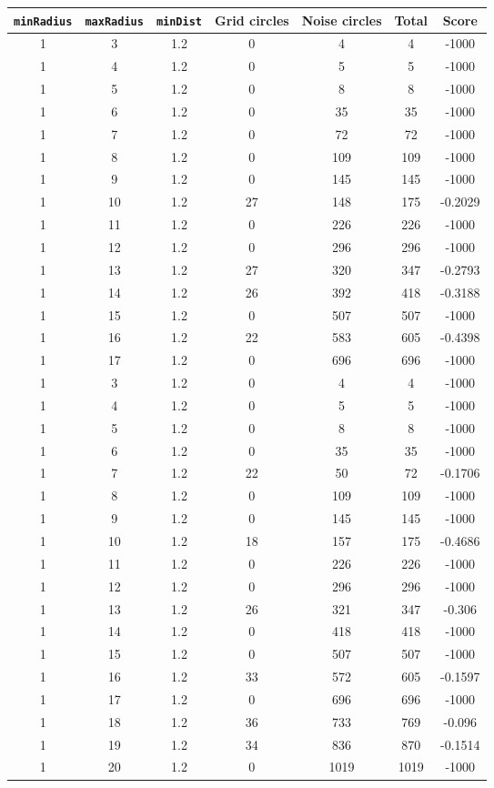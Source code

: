 \documentclass[letterpaper, 12pt]{article}
\begin{document}
\begin{longtable}{|c|c|c|c|c|c|c|}
\hline
\textbf{\texttt{minRadius}} & \textbf{\texttt{maxRadius}} & \textbf{\texttt{minDist}} & \textbf{Grid circles} & \textbf{Noise circles} & \textbf{Total} & \textbf{Score} \\
\hline
1 & 3 & 1.2 & 0 & 4 & 4 & -1000 \\
\hline
1 & 4 & 1.2 & 0 & 5 & 5 & -1000 \\
\hline
1 & 5 & 1.2 & 0 & 8 & 8 & -1000 \\
\hline
1 & 6 & 1.2 & 0 & 35 & 35 & -1000 \\
\hline
1 & 7 & 1.2 & 0 & 72 & 72 & -1000 \\
\hline
1 & 8 & 1.2 & 0 & 109 & 109 & -1000 \\
\hline
1 & 9 & 1.2 & 0 & 145 & 145 & -1000 \\
\hline
1 & 10 & 1.2 & 27 & 148 & 175 & -0.2029 \\
\hline
1 & 11 & 1.2 & 0 & 226 & 226 & -1000 \\
\hline
1 & 12 & 1.2 & 0 & 296 & 296 & -1000 \\
\hline
1 & 13 & 1.2 & 27 & 320 & 347 & -0.2793 \\
\hline
1 & 14 & 1.2 & 26 & 392 & 418 & -0.3188 \\
\hline
1 & 15 & 1.2 & 0 & 507 & 507 & -1000 \\
\hline
1 & 16 & 1.2 & 22 & 583 & 605 & -0.4398 \\
\hline
1 & 17 & 1.2 & 0 & 696 & 696 & -1000 \\
\hline
1 & 3 & 1.2 & 0 & 4 & 4 & -1000 \\
\hline
1 & 4 & 1.2 & 0 & 5 & 5 & -1000 \\
\hline
1 & 5 & 1.2 & 0 & 8 & 8 & -1000 \\
\hline
1 & 6 & 1.2 & 0 & 35 & 35 & -1000 \\
\hline
1 & 7 & 1.2 & 22 & 50 & 72 & -0.1706 \\
\hline
1 & 8 & 1.2 & 0 & 109 & 109 & -1000 \\
\hline
1 & 9 & 1.2 & 0 & 145 & 145 & -1000 \\
\hline
1 & 10 & 1.2 & 18 & 157 & 175 & -0.4686 \\
\hline
1 & 11 & 1.2 & 0 & 226 & 226 & -1000 \\
\hline
1 & 12 & 1.2 & 0 & 296 & 296 & -1000 \\
\hline
1 & 13 & 1.2 & 26 & 321 & 347 & -0.306 \\
\hline
1 & 14 & 1.2 & 0 & 418 & 418 & -1000 \\
\hline
1 & 15 & 1.2 & 0 & 507 & 507 & -1000 \\
\hline
1 & 16 & 1.2 & 33 & 572 & 605 & -0.1597 \\
\hline
1 & 17 & 1.2 & 0 & 696 & 696 & -1000 \\
\hline
1 & 18 & 1.2 & 36 & 733 & 769 & -0.096 \\
\hline
1 & 19 & 1.2 & 34 & 836 & 870 & -0.1514 \\
\hline
1 & 20 & 1.2 & 0 & 1019 & 1019 & -1000 \\
\hline
\end{longtable}
\end{document}
